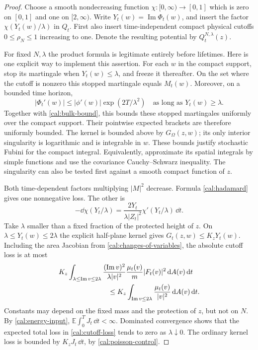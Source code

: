 \begin{proof}
Choose a smooth nondecreasing function $\chi:[0,\infty)\to[0,1]$ which
is zero on $[0,1]$ and one on $[2,\infty)$.  Write
$Y_t(w)=\operatorname{Im}\Phi_t(w)$, and insert the factor
$\chi(Y_t(w)/\lambda)$ in $Q_t$.  First also insert time-independent
compact physical cutoffs $0\leq\rho_N\leq1$ increasing to one.  Denote
the resulting potential by $Q_t^{N,\lambda}(z)$.

For fixed $N,\lambda$ the product formula is legitimate entirely before
lifetimes.  Here is one explicit way to implement this assertion.
For each $w$ in the compact support, stop its martingale when
$Y_t(w)\leq\lambda$, and freeze it thereafter.  On the set where the
cutoff is nonzero this stopped martingale equals $M_t(w)$.  Moreover,
on a bounded time horizon,
\[
 |\Phi_t'(w)|\leq |\phi'(w)|\exp(2T/\lambda^2)
       \quad\text{as long as }Y_t(w)\geq\lambda.
\]
Together with \eqref{cal:bulk-bound}, this bounds these stopped
martingales uniformly over the compact support.  Their pointwise
expected brackets are therefore uniformly bounded.  The kernel is
bounded above by $G_\Omega(z,w)$; its only interior singularity is
logarithmic and is integrable in $w$.  These bounds justify stochastic
Fubini for the compact integral.  Equivalently, approximate its spatial
integrals by simple functions and use the covariance Cauchy--Schwarz
inequality.  The singularity can also be tested first against a smooth
compact function of $z$.

Both time-dependent factors multiplying $|M|^2$ decrease.  Formula
\eqref{cal:hadamard} gives one nonnegative loss.  The other is
\[
 -\dd\chi(Y_t/\lambda)
   =\frac{2Y_t}{\lambda|Z_t|^2}\chi'(Y_t/\lambda)\,\dd t.
\]
Take $\lambda$ smaller than a fixed fraction of the protected height
of $z$.  On $\lambda\leq Y_t(w)\leq2\lambda$ the explicit half-plane
kernel gives $G_t(z,w)\leq K_zY_t(w)$.  Including the area Jacobian
from \eqref{cal:changes-of-variables}, the absolute cutoff loss is at
most
\begin{align}
 &K_z\int_{\lambda\leq\operatorname{Im}v\leq2\lambda}
       \frac{(\operatorname{Im}v)^2}{\lambda|v|^2}
       \frac{\mu_t(v)}m|F_t(v)|^2\,\dd A(v)\,\dd t
 \notag\\
 &\hspace{25mm}\leq
 K_z\int_{\operatorname{Im}v\leq2\lambda}
                      \frac{\mu_t(v)}{|v|^2}\,\dd A(v)\,\dd t.
 \label{cal:cutoff-loss}
\end{align}
Constants may depend on the fixed mass and the protection of $z$, but
not on $N$.  By \eqref{cal:energy-input},
$\mathbb E\int_0^T J_t\,\dd t<\infty$.  Dominated convergence shows
that the expected total loss in \eqref{cal:cutoff-loss} tends to zero
as $\lambda\downarrow0$.  The ordinary kernel loss is bounded by
$K_zJ_t\,\dd t$, by \eqref{cal:poisson-control}.


\end{proof}
